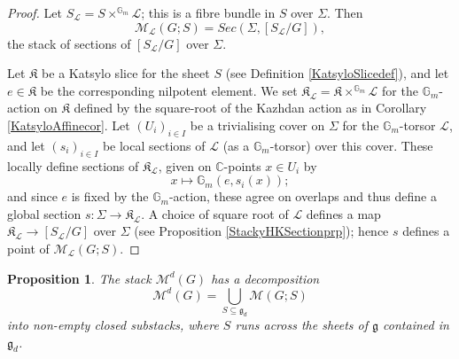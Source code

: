 \documentclass{amsart}
\newtheorem{proposition}[theorem]{Proposition}
\theoremstyle{remark}
\numberwithin{theorem}{section}
\numberwithin{equation}{section}
\begin{document}
\begin{proof}
Let $S_{\mathcal L} = S \times^{\mathbb{G}_m}\mathcal L$; this is a fibre bundle in $S$ over $\Sigma$. Then
\begin{equation}\label{SheetHiggsNonE1eqn}
    \mathcal M_{\mathcal L}(G;S) = Sec(\Sigma,[S_{\mathcal L}/G]),
\end{equation}
the stack of sections of $[S_{\mathcal L}/G]$ over $\Sigma$.

Let $\mathfrak{K}$ be a Katsylo slice for the sheet $S$ (see Definition \ref{KatsyloSlicedef}), and let $e \in \mathfrak{K}$ be the corresponding nilpotent element. We set $\mathfrak{K}_\mathcal L = \mathfrak{K} \times^{\mathbb{G}_m} \mathcal L$ for the $\mathbb{G}_m$-action on $\mathfrak{K}$ defined by the square-root of the Kazhdan action as in Corollary \ref{KatsyloAffinecor}. Let $(U_i)_{i\in I}$ be a trivialising cover on $\Sigma$ for the $\mathbb{G}_m$-torsor $\mathcal L$, and let $(s_i)_{i \in I}$ be local sections of $\mathcal L$ (as a $\mathbb{G}_m$-torsor) over this cover. These locally define sections of $\mathfrak{K}_\mathcal L$, given on $\mathbb{C}$-points $x \in U_i$ by
\begin{equation}\label{SheetHiggsNonE2eqn}
    x  \mapsto \mathbb{G}_m(e,s_i(x)); 
\end{equation}
and since $e$ is fixed by the $\mathbb{G}_m$-action, these agree on overlaps and thus define a global section $s:\Sigma \rightarrow \mathfrak{K}_\mathcal L$. A choice of square root of $\mathcal L$ defines a map $\mathfrak{K}_\mathcal L \rightarrow [S_\mathcal L/G]$ over $\Sigma$ (see Proposition \ref{StackyHKSectionprp}); hence $s$ defines a point of $\mathcal M_\mathcal L(G;S)$.
\end{proof}

\begin{proposition}\label{SheetHiggsOpenprp}
    The stack $\mathcal M^{d}(G)$ has a decomposition
    \begin{equation}\label{SheetHiggsOpen1eqn}
        \mathcal M^{d}(G) = \bigcup_{S \subseteq \mathfrak{g}_d} \mathcal M(G;S)
    \end{equation}
    into non-empty closed substacks, where $S$ runs across the sheets of $\mathfrak{g}$ contained in $\mathfrak{g}_d$.
\end{proposition}
\end{document}
